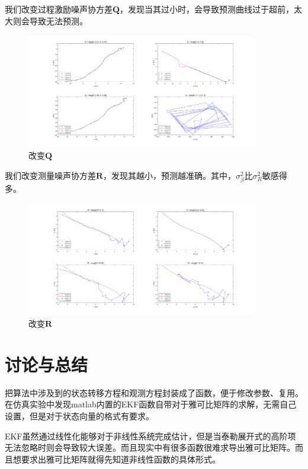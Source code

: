 \documentclass{article}
\begin{document}
我们改变过程激励噪声协方差$\mathbf{Q}$，发现当其过小时，会导致预测曲线过于超前，太大则会导致无法预测。
\begin{figure}[H]
    \centering
    \includegraphics[width = 0.9\textwidth]{imgs/comp3.png}
    \caption{改变$\mathbf{Q}$}
    \label{fig:comp3}
\end{figure}

我们改变测量噪声协方差$\mathbf{R}$，发现其越小，预测越准确。其中，$\sigma_{\beta}^{2}$比$\sigma_{R}^{2}$敏感得多。
\begin{figure}[H]
    \centering
    \includegraphics[width = 0.9\textwidth]{imgs/comp4.png}
    \caption{改变$\mathbf{R}$}
    \label{fig:comp4}
\end{figure}

\section{讨论与总结}

把算法中涉及到的状态转移方程和观测方程封装成了函数，便于修改参数、复用。在仿真实验中发现matlab内置的EKF函数自带对于雅可比矩阵的求解，无需自己设置，但是对于状态向量的格式有要求。

EKF虽然通过线性化能够对于非线性系统完成估计，但是当泰勒展开式的高阶项无法忽略时则会导致较大误差。而且现实中有很多函数很难求导出雅可比矩阵。而且想要求出雅可比矩阵就得先知道非线性函数的具体形式。

%

\begin{refcontext}[sorting = none]
\printbibliography
\end{refcontext}
\end{document}
